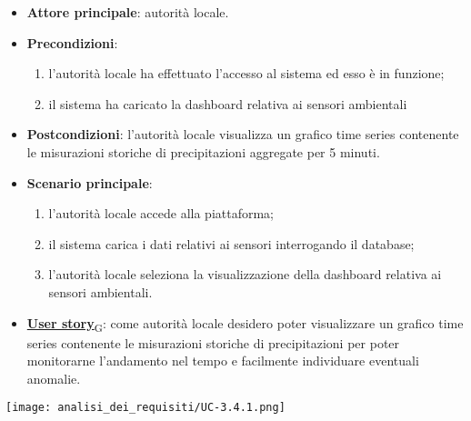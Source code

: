 \begin{itemize}
	\item \textbf{Attore principale}: autorità locale.
	\item \textbf{Precondizioni}:
	      \begin{enumerate}
		      \item l'autorità locale ha effettuato l'accesso al sistema ed esso è in funzione;
		      \item il sistema ha caricato la dashboard relativa ai sensori ambientali
	      \end{enumerate}
	\item \textbf{Postcondizioni}: l'autorità locale visualizza un grafico time series contenente le misurazioni storiche
	      di precipitazioni aggregate per 5 minuti.
	\item \textbf{Scenario principale}:
	      \begin{enumerate}
		      \item l'autorità locale accede alla piattaforma;
		      \item il sistema carica i dati relativi ai sensori interrogando il database;
		      \item l'autorità locale seleziona la visualizzazione della dashboard relativa ai sensori ambientali.
	      \end{enumerate}
	\item \href{https://7last.github.io/docs/pb/documentazione-interna/glossario\#user-story}{\textbf{User story}\textsubscript{G}}:
	      come autorità locale desidero poter visualizzare un grafico time series contenente le misurazioni storiche
	      di precipitazioni per poter monitorarne l'andamento nel tempo e facilmente individuare eventuali anomalie.
\end{itemize}
\begin{center}
	\texttt{[image: analisi\_dei\_requisiti/UC-3.4.1.png]}
\end{center}


